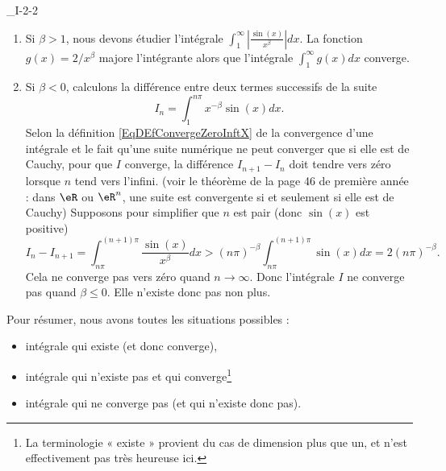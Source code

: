

\begin{corrige}{_I-2-2}

\begin{enumerate}
\item Si $\beta>1$, nous devons étudier l'intégrale $\int_1^{\infty}\left| \frac{ \sin(x) }{ x^{\beta} }  \right|dx$. La fonction $g(x)=2/x^{\beta}$ majore l'intégrante alors que l'intégrale $\int_1^{\infty}g(x)dx$ converge.

\item Si $\beta<0$, calculons la différence entre deux termes successifs de la suite
\begin{equation}		\label{EqInACaclDiff}
	I_n=\int_1^{n\pi}x^{-\beta}\sin(x)dx.
\end{equation}
Selon la définition \eqref{EqDEfConvergeZeroInftX} de la convergence d'une intégrale et le fait qu'une suite numérique ne peut converger que si elle est de Cauchy, pour que $I$ converge, la différence $I_{n+1}-I_n$ doit tendre vers zéro lorsque $n$ tend vers l'infini. (voir le théorème de la page 46 de première année : dans $\eR$ ou $\eR^n$, une suite est convergente si et seulement si elle est de Cauchy) Supposons pour simplifier que $n$ est pair (donc $\sin(x)$ est positive)
\begin{equation}
	I_n-I_{n+1}=\int_{n\pi}^{(n+1)\pi}\frac{ \sin(x) }{ x^{\beta} }dx>(n\pi)^{-\beta}\int_{n\pi}^{(n+1)\pi}\sin(x)dx=2(n\pi)^{-\beta}.
\end{equation}
Cela ne converge pas vers zéro quand $n\to\infty$. Donc l'intégrale $I$ ne converge pas quand $\beta\leq 0$. Elle n'existe donc pas non plus.


\end{enumerate}
Pour résumer, nous avons toutes les situations possibles :
\begin{itemize}
\item intégrale qui existe (et donc converge),
\item intégrale qui n'existe pas et qui converge\footnote{La terminologie « existe » provient du cas de dimension plus que un, et n'est effectivement pas très heureuse ici.}
\item intégrale qui ne converge pas (et qui n'existe donc pas).
\end{itemize}

\end{corrige}
